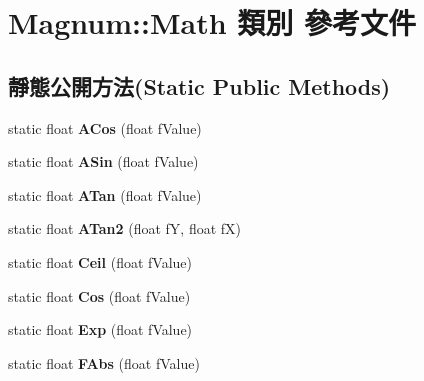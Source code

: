 \hypertarget{class_magnum_1_1_math}{}\section{Magnum\+:\+:Math 類別 參考文件}
\label{class_magnum_1_1_math}
\subsection*{靜態公開方法(Static Public Methods)}
\begin{DoxyCompactItemize}
\item 
static float {\bfseries A\+Cos} (float f\+Value)\hypertarget{class_magnum_1_1_math_ac75a95c6a742382fb6958035d77dafe2}{}\label{class_magnum_1_1_math_ac75a95c6a742382fb6958035d77dafe2}

\item 
static float {\bfseries A\+Sin} (float f\+Value)\hypertarget{class_magnum_1_1_math_a8fcd209a021db5cef9248a478ff42393}{}\label{class_magnum_1_1_math_a8fcd209a021db5cef9248a478ff42393}

\item 
static float {\bfseries A\+Tan} (float f\+Value)\hypertarget{class_magnum_1_1_math_a508087f5264205a88de97adb42126372}{}\label{class_magnum_1_1_math_a508087f5264205a88de97adb42126372}

\item 
static float {\bfseries A\+Tan2} (float fY, float fX)\hypertarget{class_magnum_1_1_math_a8c41f4748f96220908bdbca30a694210}{}\label{class_magnum_1_1_math_a8c41f4748f96220908bdbca30a694210}

\item 
static float {\bfseries Ceil} (float f\+Value)\hypertarget{class_magnum_1_1_math_a6dc3d75831de7e0698bbb0eada95f260}{}\label{class_magnum_1_1_math_a6dc3d75831de7e0698bbb0eada95f260}

\item 
static float {\bfseries Cos} (float f\+Value)\hypertarget{class_magnum_1_1_math_a1cb64de79f99208a5a6ec6f18e3ee845}{}\label{class_magnum_1_1_math_a1cb64de79f99208a5a6ec6f18e3ee845}

\item 
static float {\bfseries Exp} (float f\+Value)\hypertarget{class_magnum_1_1_math_a46d021a954ec7b946b7b15fc569023af}{}\label{class_magnum_1_1_math_a46d021a954ec7b946b7b15fc569023af}

\item 
static float {\bfseries F\+Abs} (float f\+Value)\hypertarget{class_magnum_1_1_math_aa5d14c4582d422bf85bcdd625bbd4fa1}{}\label{class_magnum_1_1_math_aa5d14c4582d422bf85bcdd625bbd4fa1}


\end{DoxyCompactItemize}
